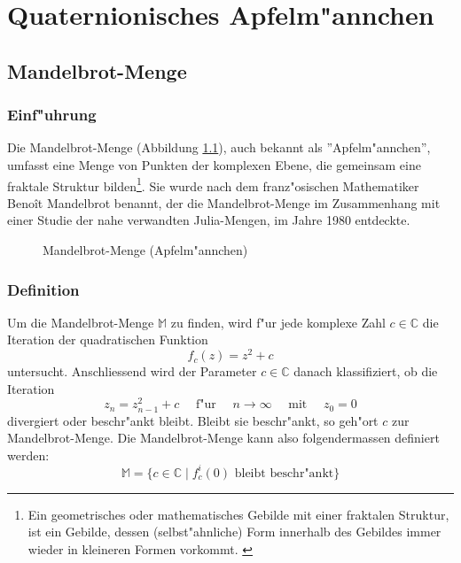 \chapter{Quaternionisches Apfelm"annchen}
\begin{refsection}

\section{Mandelbrot-Menge}

	\subsection{Einf"uhrung}
		Die Mandelbrot-Menge (Abbildung \ref{fig. appleman}), auch bekannt als ''Apfelm"annchen'', umfasst eine Menge von Punkten der komplexen Ebene, die gemeinsam eine fraktale Struktur bilden\footnote{Ein geometrisches oder mathematisches Gebilde mit einer fraktalen Struktur, ist ein Gebilde,  dessen (selbst"ahnliche) Form innerhalb des Gebildes immer wieder in kleineren Formen vorkommt. \cite{fraktal}}. Sie wurde nach dem franz"osischen Mathematiker Beno\^it Mandelbrot benannt, der die Mandelbrot-Menge im Zusammenhang mit einer Studie der nahe verwandten Julia-Mengen, im Jahre 1980 entdeckte. \cite{wiki}\\[-0.95cm]
		\begin{figure}[ht!]\centering
			\begin{adjustbox}{scale=0.45, keepaspectratio}
				
			\end{adjustbox}
			\caption{Mandelbrot-Menge (Apfelm"annchen)}
			\label{fig. appleman}
		\end{figure}
		
	\subsection{Definition}
		Um die Mandelbrot-Menge $\mathbb{M}$ zu finden, wird f"ur jede komplexe Zahl $c\in\mathbb{C}$ die Iteration der quadratischen Funktion
		\begin{equation}
			f_c(z) = z^2+c
			\label{equ. itformel}
		\end{equation}
		untersucht. Anschliessend wird der Parameter $c\in\mathbb{C}$ danach klassifiziert, ob die Iteration
		\begin{equation}
			z_{n} = z_{n-1}^2+c\quad\text{ f"ur }\quad n\rightarrow\infty \quad\text{ mit }\quad z_0 = 0
			\label{equ. rekformel}
		\end{equation}
		divergiert oder beschr"ankt bleibt. Bleibt sie beschr"ankt, so geh"ort $c$ zur Mandelbrot-Menge. Die Mandelbrot-Menge kann also folgendermassen definiert werden: \cite{wiki}
		\begin{equation}
			\mathbb{M} = \{c\in\mathbb{C}\;|\; f_c^i(0) \text{ bleibt beschr"ankt}\}
			\label{equ. defMandelbrotmengeComplex}
		\end{equation}	
		

\end{refsection}
